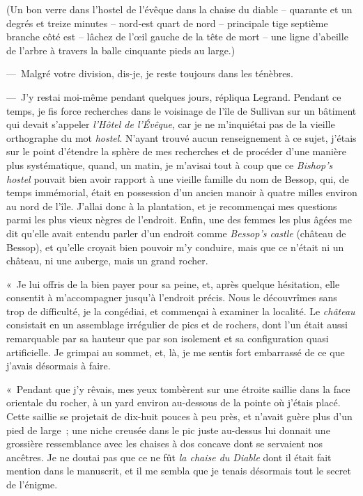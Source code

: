 \documentclass[french,twoside]{book} %
\begin{document}
\bigbreak
{}\par
(Un bon verre dans l’hostel de l’évêque dans la chaise du diable – quarante et un degrés et treize minutes – nord-est quart de nord – principale tige septième branche côté est – lâchez de l’œil gauche de la tête de mort – une ligne d’abeille de l’arbre à travers la balle cinquante pieds au large.)\par
\bigbreak
\noindent — Malgré votre division, dis-je, je reste toujours dans les ténèbres.\par
— J’y restai moi-même pendant quelques jours, répliqua Legrand. Pendant ce temps, je fis force recherches dans le voisinage de l’île de Sullivan sur un bâtiment qui devait s’appeler \emph{l’Hôtel de l’Évêque}, car je ne m’inquiétai pas de la vieille orthographe du mot \emph{hostel}. N’ayant trouvé aucun renseignement à ce sujet, j’étais sur le point d’étendre la sphère de mes recherches et de procéder d’une manière plus systématique, quand, un matin, je m’avisai tout à coup que ce \emph{Bishop’s hostel} pouvait bien avoir rapport à une vieille famille du nom de Bessop, qui, de temps immémorial, était en possession d’un ancien manoir à quatre milles environ au nord de l’île. J’allai donc à la plantation, et je recommençai mes questions parmi les plus vieux nègres de l’endroit. Enfin, une des femmes les plus âgées me dit qu’elle avait entendu parler d’un endroit comme \emph{Bessop’s castle} (château de Bessop), et qu’elle croyait bien pouvoir m’y conduire, mais que ce n’était ni un château, ni une auberge, mais un grand rocher.\par
« Je lui offris de la bien payer pour sa peine, et, après quelque hésitation, elle consentit à m’accompagner jusqu’à l’endroit précis. Nous le découvrîmes sans trop de difficulté, je la congédiai, et commençai à examiner la localité. Le \emph{château} consistait en un assemblage irrégulier de pics et de rochers, dont l’un était aussi remarquable par sa hauteur que par son isolement et sa configuration quasi artificielle. Je grimpai au sommet, et, là, je me sentis fort embarrassé de ce que j’avais désormais à faire.\par
« Pendant que j’y rêvais, mes yeux tombèrent sur une étroite saillie dans la face orientale du rocher, à un yard environ au-dessous de la pointe où j’étais placé. Cette saillie se projetait de dix-huit pouces à peu près, et n’avait guère plus d’un pied de large ; une niche creusée dans le pic juste au-dessus lui donnait une grossière ressemblance avec les chaises à dos concave dont se servaient nos ancêtres. Je ne doutai pas que ce ne fût \emph{la chaise du Diable} dont il était fait mention dans le manuscrit, et il me sembla que je tenais désormais tout le secret de l’énigme.\par
\end{document}
